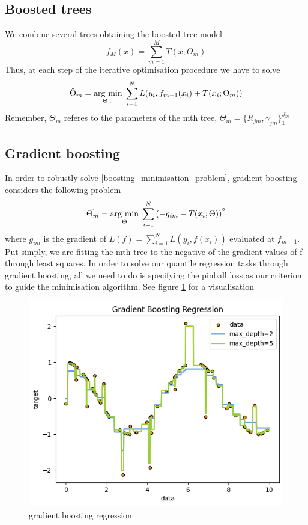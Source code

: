\subsection{Boosted trees}
We combine several trees obtaining the boosted tree model
\begin{equation}
    f_M(x)=\sum\limits_{m=1}^M T(x;\Theta_m)
\end{equation}
Thus, at each step of the iterative optimisation procedure we have to solve
\begin{equation}\label{boosting_minimisation_problem}
    \hat{\Theta}_m=\underset{\Theta_m}{\operatorname{arg}\,\operatorname{min}}\;\sum\limits_{i=1}^{N}L(y_i, f_{m-1}(x_i)+T(x_i;\Theta_m))
\end{equation}
Remember, $\Theta_m$ referes to the parameters of the mth tree, $\Theta_m=\{R_{jm}, \gamma_{jm}\}_1^{J_m}$
\subsection{Gradient boosting}
In order to robustly solve \ref{boosting_minimisation_problem}, gradient boosting considers the following problem
\begin{equation}
    \tilde{\Theta_m}=\underset{\Theta}{\operatorname{arg}\,\operatorname{min}}\;\sum\limits_{i=1}^{N}\left(-g_{im}-T(x_i;\Theta)\right)^2
\end{equation}
where $g_{im}$ is the gradient of $L(f)=\sum\limits_{i=1}^N L(y_i, f(x_i))$ evaluated at $f_{m-1}$. Put simply, we are fitting the mth tree to the negative of the gradient values of f through least squares.
In order to solve our quantile regression tasks through gradient boosting, all we need to do is specifying the pinball loss as our criterion to guide the minimisation algorithm. See figure \ref{fig:gradient_boosting} for a visualisation
\begin{figure}
    \includegraphics[width=\textwidth]{images/gradient_boosting.png}
    \caption{gradient boosting regression}
    \label{fig:gradient_boosting}
\end{figure}



